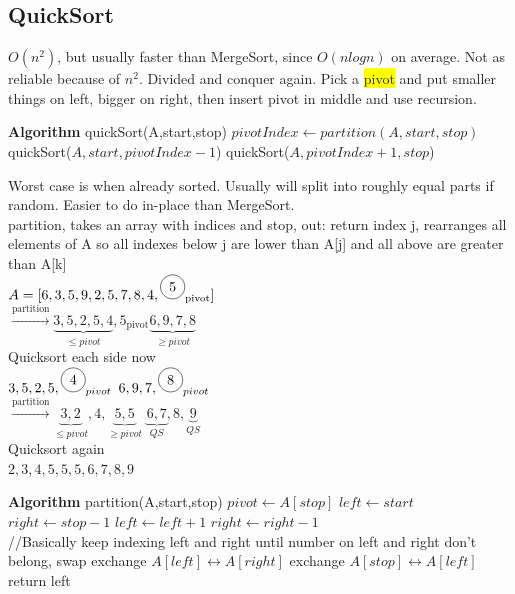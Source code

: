 \subsection{QuickSort}
$O(n^2)$, but usually faster than MergeSort, since $O(n log n)$ on average. Not as reliable because of $n^2$. Divided and conquer again. Pick a \colorbox{Yellow}{pivot} and put smaller things on left, bigger on right, then insert pivot in middle and use recursion.
\begin{algorithmic}
	\State \textbf{Algorithm} quickSort(A,start,stop)
		\State $pivotIndex \gets partition(A,start,stop)$
		\State quickSort($A,start,pivotIndex-1$)
		\State quickSort($A,pivotIndex+1,stop$)
	\EndIf
\end{algorithmic}
Worst case is when already sorted. Usually will split into roughly equal parts if random. Easier to do in-place than MergeSort.
\\ partition, takes an array with indices and stop, out: return index j, rearranges all elements of A so all indexes below j are lower than A[j] and all above are greater than A[k]
\\ $A = [6, 3, 5, 9, 2, 5, 7, 8, 4, \tikz \node[draw,circle]{5};_{\text{pivot}}]$
\\ $\stackrel{\text{partition}}{\rightarrow} \underbrace{3,5,2,5,4}_{\leq pivot}, 5_{\text{pivot}}\underbrace{6,9,7,8}_{\geq pivot}$
\\ Quicksort each side now
\\$ 3,5,2,5,\tikz\node[draw,circle]{4};_{pivot}$\hspace{20 pt} $6,9,7,\tikz\node[draw,circle]{8};_{pivot}$
\\ $\stackrel{\text{partition}}{\rightarrow}\underbrace{3,2}_{\leq pivot}, 4 ,\underbrace{5,5}_{\geq pivot}$ \hspace{20 pt} $\underbrace{6,7}_{QS},8,\underbrace{9}_{QS}$
\\ Quicksort again
\\ $2,3,4,5,5,5,6,7,8,9$
\begin{algorithmic}
	\State \textbf{Algorithm} partition(A,start,stop)
	\State $pivot \gets A[stop]$
	\State $left \gets start$
	\State $right \gets stop-1$
		 $left \gets left+1$
		\EndWhile
		 $right \gets right-1$
		\EndWhile
		\\ //Basically keep indexing left and right until number on left and right don't belong, swap
		 exchange $A[left]\leftrightarrow A[right]$
		\EndIf
	\EndWhile
	\State exchange $A[stop]\leftrightarrow A[left]$
	\State return left
\end{algorithmic}
\color{Orange}
